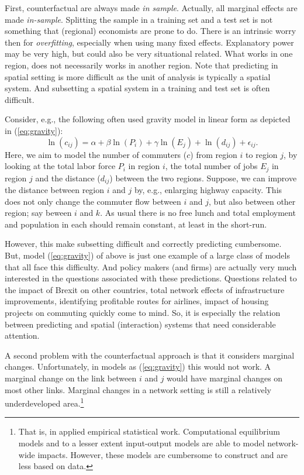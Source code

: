 \documentclass[fleqn,10pt]{SelfArx} %
\begin{document}
First, counterfactual are always made \emph{in sample}. Actually, all marginal
effects are made \emph{in-sample}. Splitting the sample in a training set and a
test set is not something that (regional) economists are prone to do. There is
an intrinsic worry then for \emph{overfitting}, especially when using many fixed
effects. Explanatory power may be very high, but could also be very situational
related. What works in one region, does not necessarily works in another region.
Note that predicting in spatial setting is more difficult as the unit of
analysis is typically a spatial system. And subsetting a spatial system in a
training and test set is often difficult.

Consider, e.g., the following often used gravity model in linear form as
depicted in (\ref{eq:gravity}): 
\begin{equation}
  \label{eq:gravity}
  \ln(c_{ij}) = \alpha + \beta \ln(P_i) + \gamma \ln(E_j) + \ln(d_{ij}) + \epsilon_{ij}.
\end{equation}
Here, we aim to model the number of commuters ($c$) from region $i$ to region
$j$, by looking at the total labor force $P_i$ in region $i$, the total number of
jobs $E_j$ in region $j$ and the distance ($d_{ij}$) between the two regions.
Suppose, we can improve the distance between region $i$ and $j$ by, e.g.,
enlarging highway capacity. This does not only change the commuter flow between
$i$ and $j$, but also between other region; say beween $i$ and $k$. As usual
there is no free lunch and total employment and population in each should remain
constant, at least in the short-run.

However, this make subsetting difficult and correctly predicting cumbersome.
But, model (\ref{eq:gravity}) of above is just one example of a large class of
models that all face this difficulty. And policy makers (and firms) are actually
very much interested in the questions associated with these predictions.
Questions related to the impact of Brexit on other countries, total network
effects of infrastructure improvements, identifying profitable routes for
airlines, impact of housing projects on commuting quickly come to mind. So, it
is especially the relation between predicting and spatial (interaction) systems
that need considerable attention.

A second problem with the counterfactual approach is that it considers marginal
changes. Unfortunately, in models as (\ref{eq:gravity}) this would not work. A
marginal change on the link between $i$ and $j$ would have marginal changes on
most other links. Marginal changes in a network setting is still a relatively
underdeveloped area.\footnote{That is, in applied empirical statistical work.
  Computational equilibrium models and to a lesser extent input-output models
  are able to model network-wide impacts. However, these models are cumbersome
  to construct and are less based on data.}
\end{document}
